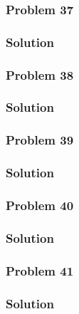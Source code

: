 \documentclass[journal,12pt,twocolumn]{IEEEtran}
\begin{document}
\subsubsection{Problem 37}

%
\subsubsection{Solution}


\subsubsection{Problem 38}

%
\subsubsection{Solution}


\subsubsection{Problem 39}

%
\subsubsection{Solution}


\subsubsection{Problem 40}

%
\subsubsection{Solution}


\subsubsection{Problem 41}

%
\subsubsection{Solution}


%
%
%
\end{document}
